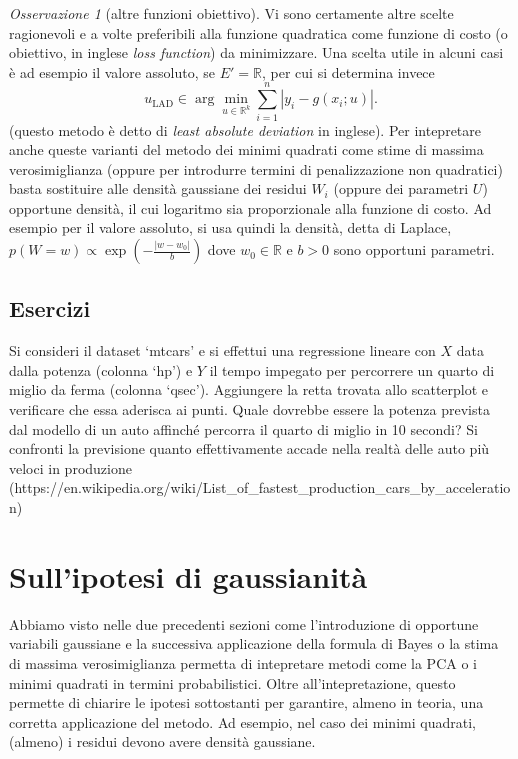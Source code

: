 \documentclass[
  italian,
  letterpaper,
]{book}
\newcommand{\bra}[1]{\left( #1 \right)}
\newcommand{\R}{\mathbb{R}}
\theoremstyle{definition}
\theoremstyle{remark}
\newtheorem*{remark}{Osservazione}
\begin{document}
\begin{remark}[altre funzioni obiettivo]
Vi sono certamente altre scelte ragionevoli e a volte preferibili alla
funzione quadratica come funzione di costo (o obiettivo, in inglese
\emph{loss function}) da minimizzare. Una scelta utile in alcuni casi è
ad esempio il valore assoluto, se \(E' = \R\), per cui si determina
invece
\[ u_{\operatorname{LAD}} \in \arg \min_{u \in \R^k}\sum_{i=1}^n |y_i - g(x_i; u)|.\]
(questo metodo è detto di \emph{least absolute deviation} in inglese).
Per intepretare anche queste varianti del metodo dei minimi quadrati
come stime di massima verosimiglianza (oppure per introdurre termini di
penalizzazione non quadratici) basta sostituire alle densità gaussiane
dei residui \(W_i\) (oppure dei parametri \(U\)) opportune densità, il
cui logaritmo sia proporzionale alla funzione di costo. Ad esempio per
il valore assoluto, si usa quindi la densità, detta di Laplace,
\(p (W = w ) \propto \exp\bra{- \frac{|w-w_0|}{b}}\) dove \(w_0\in \R\)
e \(b>0\) sono opportuni parametri.
\end{remark}

\subsection{Esercizi}\label{esercizi-30}

Si consideri il dataset `mtcars' e si effettui una regressione lineare
con \(X\) data dalla potenza (colonna `hp') e \(Y\) il tempo impegato
per percorrere un quarto di miglio da ferma (colonna `qsec'). Aggiungere
la retta trovata allo scatterplot e verificare che essa aderisca ai
punti. Quale dovrebbe essere la potenza prevista dal modello di un auto
affinché percorra il quarto di miglio in 10 secondi? Si confronti la
previsione quanto effettivamente accade nella realtà delle auto più
veloci in produzione
(https://en.wikipedia.org/wiki/List\_of\_fastest\_production\_cars\_by\_acceleration)

\section{Sull'ipotesi di gaussianità}\label{sec-test}

Abbiamo visto nelle due precedenti sezioni come l'introduzione di
opportune variabili gaussiane e la successiva applicazione della formula
di Bayes o la stima di massima verosimiglianza permetta di intepretare
metodi come la PCA o i minimi quadrati in termini probabilistici. Oltre
all'intepretazione, questo permette di chiarire le ipotesi sottostanti
per garantire, almeno in teoria, una corretta applicazione del metodo.
Ad esempio, nel caso dei minimi quadrati, (almeno) i residui devono
avere densità gaussiane.
\end{document}
